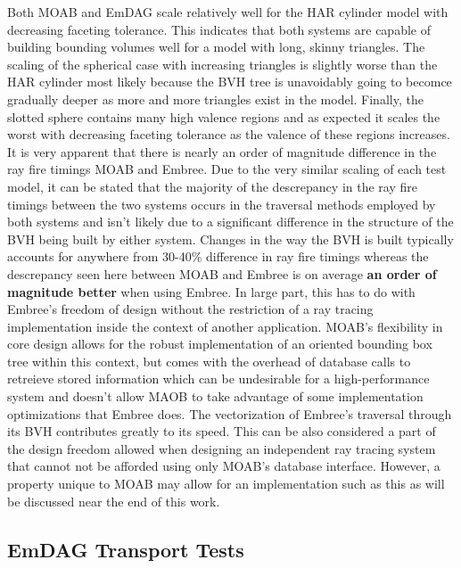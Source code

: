 \documentclass[12pt, a4paper]{article}
\begin{document}
Both MOAB and EmDAG scale relatively well for the HAR cylinder model with decreasing faceting tolerance. This indicates that both systems are capable of building bounding volumes well for a model with long, skinny triangles. The scaling of the spherical case with increasing triangles is slightly worse than the HAR cylinder most likely because the BVH tree is unavoidably going to becomce gradually deeper as more and more triangles exist in the model. Finally, the slotted sphere contains many high valence regions and as expected it scales the worst with decreasing faceting tolerance as the valence of these regions increases. It is very apparent that there is nearly an order of magnitude difference in the ray fire timings MOAB and Embree. Due to the very similar scaling of each test model, it can be stated that the majority of the descrepancy in the ray fire timings between the two systems occurs in the traversal methods employed by both systems and isn't likely due to a significant difference in the structure of the BVH being built by either system. Changes in the way the BVH is built typically accounts for anywhere from 30-40\% difference in ray fire timings whereas the descrepancy seen here between MOAB and Embree is on average \textbf{an order of magnitude better} when using Embree. In large part, this has to do with Embree's freedom of design without the restriction of a ray tracing implementation inside the context of another application. MOAB's flexibility in core design allows for the robust implementation of an oriented bounding box tree within this context, but comes with the overhead of database calls to retreieve stored information which can be undesirable for a high-performance system and doesn't allow MAOB to take advantage of some implementation optimizations that Embree does. The vectorization of Embree's traversal through its BVH contributes greatly to its speed. This can be also considered a part of the design freedom allowed when designing an independent ray tracing system that cannot not be afforded using only MOAB's database interface. However, a property unique to MOAB may allow for an implementation such as this as will be discussed near the end of this work.

\subsection{EmDAG Transport Tests}
\label{subsec:emdag_transport}
\end{document}
